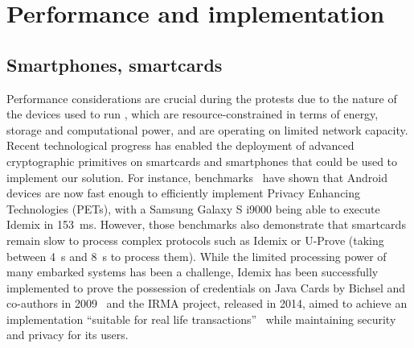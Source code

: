 \section{Performance and implementation}
\label{PerformanceAnalysis}

\subsection{Smartphones, smartcards}
Performance considerations are crucial during the protests due to the nature of the devices used to run \CROCUS, which are resource-constrained in terms of energy, storage and computational power, and are operating on limited network capacity. 
Recent technological progress has enabled the deployment of advanced cryptographic primitives on smartcards and smartphones that could be used to implement our solution.
For instance, benchmarks~\cite{Benchmarking} have shown that Android devices are now fast enough to efficiently implement Privacy Enhancing Technologies (PETs), with a Samsung Galaxy S i9000 being able to execute Idemix in \SI{153}{\milli\second}. 
However, those benchmarks also demonstrate that smartcards remain slow to process complex protocols such as Idemix or U-Prove (taking between \SI{4}{\second} and \SI{8}{\second} to process them). 
While the limited processing power of many embarked systems has been a challenge, Idemix has been successfully implemented to prove the possession of credentials on Java Cards by Bichsel and co-authors in 2009~\cite{Bichsel} and the IRMA project, released in 2014, aimed to achieve an implementation ``suitable for real life transactions''~\cite{IRMA} while maintaining security and privacy for its users. 

